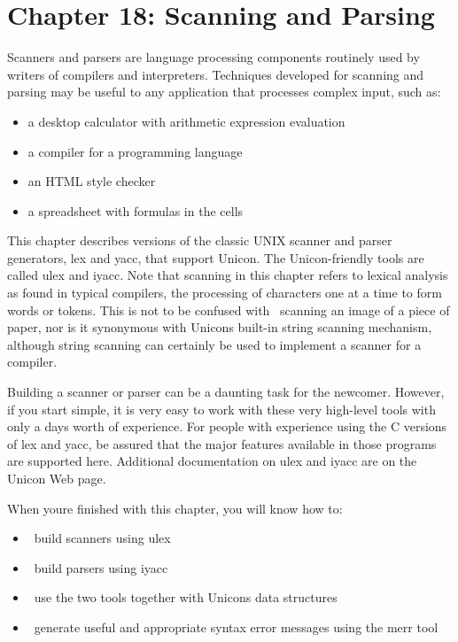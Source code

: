 \clearpage\section{Chapter 18: Scanning and Parsing}

Scanners and parsers are language processing components routinely used
by writers of compilers and interpreters. Techniques developed for
scanning and parsing may be useful to any application that processes
complex input, such as:

\begin{itemize}
\item a desktop calculator with arithmetic expression evaluation
\item a compiler for a programming language
\item an HTML style checker
\item a spreadsheet with formulas in the cells
\end{itemize}

This chapter describes versions of the classic UNIX scanner and parser
generators, \textsf{lex} and \textsf{yacc}, that
support Unicon. The Unicon-friendly tools are called \textsf{ulex} and
\textsf{iyacc}. Note that scanning in this chapter refers to lexical
analysis as found in typical compilers, the processing of characters
one at a time to form words or tokens. This is not to be confused with
\ scanning an image of a piece of paper, nor is it synonymous with
Unicon{\textquotesingle}s built-in string scanning mechanism, although
string scanning can certainly be used to implement a scanner for a
compiler.

Building a scanner or parser can be a daunting task for
the newcomer. However, if you start simple, it is very easy to work
with these very high-level tools with only a day{\textquotesingle}s
worth of experience. For people with experience using the C versions of
\textsf{lex} and \textsf{yacc}, be assured that the major features
available in those programs are supported here. Additional
documentation on \textsf{ulex} and \textsf{iyacc} are on the Unicon Web
page.

When you{\textquotesingle}re finished with this chapter, you will know
how to:

\begin{itemize}
\item \ build scanners using \textsf{ulex}
\item \ build parsers using \textsf{iyacc}
\item \ use the two tools together with Unicon{\textquotesingle}s data
structures
\item \ generate useful and appropriate syntax error messages using the
\textsf{merr} tool
\end{itemize}

